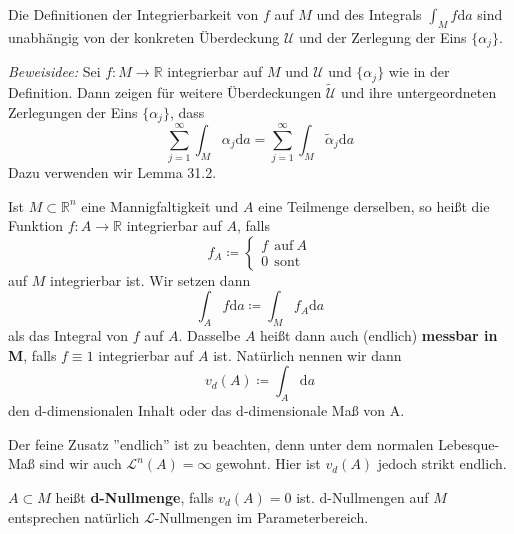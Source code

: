 \begin{satz}
	Die Definitionen der Integrierbarkeit von $f$ auf $M$ und des 
	Integrals $\int_Mf\mathrm{d}a$ sind unabhängig von der 
	konkreten Überdeckung $\mathcal{U}$ und der Zerlegung der Eins $\{\alpha_j\}$.
\end{satz}

\emph{Beweisidee:} Sei $f:M\rightarrow\mathbb{R}$ integrierbar auf 
$M$ und $\mathcal{U}$ und $\{\alpha_j\}$ wie in der Definition. Dann 
zeigen für weitere Überdeckungen $\tilde{\mathcal{U}}$ und ihre 
untergeordneten Zerlegungen der Eins $\{\alpha_j\}$, dass 
\begin{equation*}
	\sum\limits_{j=1}^\infty\int_M\alpha_j\mathrm{d}a = 
	\sum\limits_{j=1}^\infty\int_M\tilde{\alpha}_j\mathrm{d}a
\end{equation*}
Dazu verwenden wir Lemma 31.2.\\
\linebreak

\begin{definition}
	Ist $M\subset\mathbb{R}^n$ eine Mannigfaltigkeit und $A$ eine 
	Teilmenge derselben, so heißt die Funktion $f:A\rightarrow\mathbb{R}$ 
	integrierbar auf $A$, falls
	\begin{equation*}
		f_A\coloneqq\left\{\begin{matrix}
		f \ \ \mathrm{auf\ }A \\ 0 \ \ \mathrm{sont}
		\end{matrix}\right.
	\end{equation*}
	auf $M$ integrierbar ist.
	Wir setzen dann
	\begin{equation*}
		\int_Af\mathrm{d}a\coloneqq\int_Mf_A\mathrm{d}a
	\end{equation*}
	als das Integral von $f$ auf $A$. Dasselbe $A$ heißt dann auch
	(endlich) \textbf{messbar in M}, falls $f\equiv 1$ integrierbar 
	auf $A$ ist. Natürlich nennen wir dann
	\begin{equation*}
		v_d(A)\coloneqq\int_A\mathrm{d}a
	\end{equation*}
	den d-dimensionalen Inhalt oder das d-dimensionale Maß von A.
\end{definition}
Der feine Zusatz ''endlich'' ist zu beachten, denn unter dem normalen 
Lebesque-Maß sind wir auch $\mathcal{L}^n(A)=\infty$ gewohnt. Hier 
ist $v_d(A)$ jedoch strikt endlich.

\begin{definition}[d-Nullmengen]
$A\subset M$ heißt \textbf{d-Nullmenge}, falls $v_d(A)=0$ ist. 
d-Nullmengen auf $M$ entsprechen natürlich $\mathcal{L}$-Nullmengen 
im Parameterbereich.
\end{definition}

